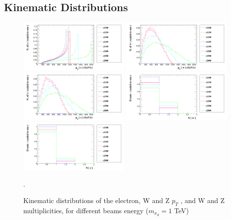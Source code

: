 \documentclass[epj,nopacs,fleqn]{svjour}
\begin{document}
\subsection{Kinematic Distributions}
\begin{figure}[!b]
	\centering
	\subfigure
	{ \includegraphics[width=0.49\textwidth]{Fig/xdxd_ee_eeZ_eveW/e_pt.png}}
	\subfigure
{ \includegraphics[width=0.49\textwidth]{Fig/xdxd_ee_eeZ_eveW/W_pt.png}}
	\subfigure
{ \includegraphics[width=0.49\textwidth]{Fig/xdxd_ee_eeZ_eveW/Z_pt.png}}
	\subfigure
{ \includegraphics[width=0.49\textwidth]{Fig/xdxd_ee_eeZ_eveW/W_m.png}}
	\subfigure
{ \includegraphics[width=0.49\textwidth]{Fig/xdxd_ee_eeZ_eveW/Z_m.png}}
	
	\caption{Kinematic distributions of the electron, W and Z $p_T$ , and W and Z multiplicities, for different beams energy ($m_{x_d}=1$ TeV)}.
	\label{woff_100}
\end{figure}
\end{document}
